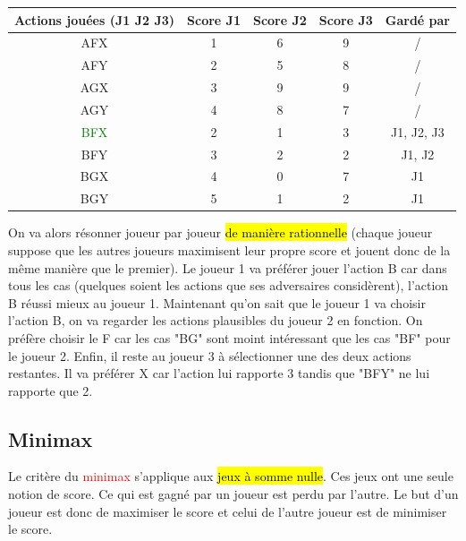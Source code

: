 \documentclass[a4paper, 12pt]{article}
\newcommand{\alinea}{
\hspace*{0.5cm}}
\newcommand{\red}[1]{
	\textcolor{red}{#1}}
\newcommand{\green}[1]{
	\textcolor{green}{#1}}
\begin{document}
			\begin{center}
				\begin{tabular}{|c|c|c|c|c|}
					\hline
					\textbf{Actions jouées (J1 J2 J3)} & \textbf{Score J1} & \textbf{Score J2} & \textbf{Score J3} & \textbf{Gardé par}\\
					\hline
					AFX & 1 & 6 & 9 & /\\
					AFY & 2 & 5 & 8 & /\\
					AGX & 3 & 9 & 9 & /\\
					AGY & 4 & 8 & 7 & /\\
					\green{BFX} & 2 & 1 & 3 & J1, J2, J3\\
					BFY & 3 & 2 & 2 & J1, J2\\
					BGX & 4 & 0 & 7 & J1\\
					BGY & 5 & 1 & 2 & J1\\
					\hline
				\end{tabular}
			\end{center}
		\alinea On va alors résonner joueur par joueur \hl{de manière rationnelle} (chaque joueur suppose que les autres joueurs 
			maximisent leur propre score et jouent donc de la même manière que le premier). 
			Le joueur 1 va préférer jouer l'action B car dans tous les cas (quelques soient
			les actions que ses adversaires considèrent), l'action B réussi mieux au joueur 1. Maintenant qu'on sait que le joueur 1
			va choisir l'action B, on va regarder les actions plausibles du joueur 2 en fonction. On préfère choisir le F car
			les cas "BG" sont moint intéressant que les cas "BF" pour le joueur 2. Enfin, il reste au joueur 3 à sélectionner une des 
			deux actions restantes. Il va préférer X car l'action lui rapporte 3 tandis que "BFY" ne lui rapporte que 2.
	\subsection{Minimax}
		\alinea Le critère du \red{minimax} s'applique aux \red{\hl{jeux à somme nulle}}. Ces jeux ont une seule notion de score.
			Ce qui est gagné par un joueur est perdu par l'autre. Le but d'un joueur est donc de maximiser le score et celui
			de l'autre joueur est de minimiser le score.
\end{document}
